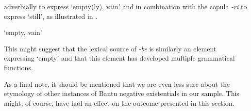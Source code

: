 \documentclass[output=paper]{langsci/langscibook}
\begin{document}
adverbially to express `empty(ly), vain' and in combination with the copula
\textit{-ri} to express `still', as illustrated in
.  \begin{exe}
\ex\label{ex:tumbuka-empty-persist}  \begin{xlist} \ex `empty, vain'
\begin{xlist}   \end{xlist}
\end{xlist} \end{exe} 
%
This might suggest that the lexical source of \textit{-be} is similarly an
element expressing `empty' and that this element has developed multiple
grammatical functions.

As a final note, it should be mentioned that we are even less sure about
the etymology of other instances of Bantu negative existentials in our
sample. This might, of course, have had an effect on the outcome presented in this section.
\end{document}
